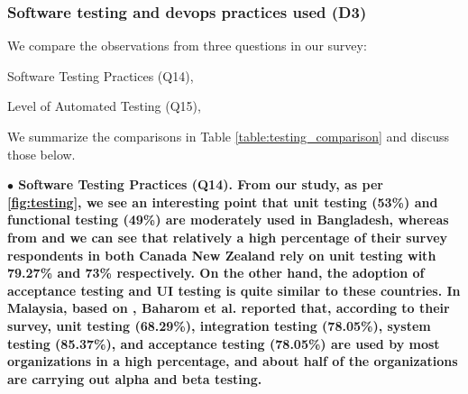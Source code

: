 \subsubsection{Software testing and devops practices used (D3)}\label{sec:rq2-d3}
We compare the observations from three questions in our survey: \begin{inparaenum}
\item Software Testing Practices (Q14),
\item Level of Automated Testing (Q15),
\end{inparaenum} We summarize the comparisons in Table \ref{table:testing_comparison} and discuss those below.


\nd\bf{$\bullet$ Software Testing Practices (Q14)}. From our study, as per
\ref{fig:testing}, we see an interesting point that unit testing (53\%) and
functional testing (49\%) are moderately used in Bangladesh, whereas from
\citep{Garousi2013} and \citep{Wang2018} we can see that relatively a high
percentage of their survey respondents in both Canada New Zealand rely on unit
testing with 79.27\% and 73\% respectively. On the other hand, the adoption of
acceptance testing and UI testing is quite similar to these countries. In
Malaysia, based on \citep{Baharom2006}, Baharom et al. reported that, according
to their survey, unit testing (68.29\%), integration testing (78.05\%), system
testing (85.37\%), and acceptance testing (78.05\%) are used by most
organizations in a high percentage, and about half of the organizations are
carrying out alpha and beta testing.

